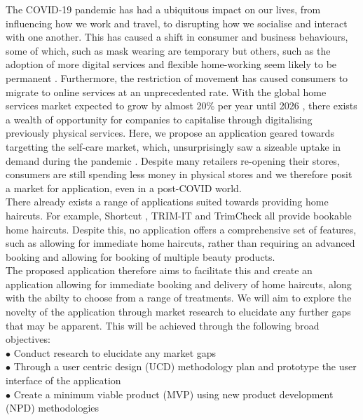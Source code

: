 \documentclass[12pt]{article}
\begin{document}
	
	
	The COVID-19 pandemic has had a ubiquitous impact on our lives, from influencing how we work and travel, to disrupting how we socialise and interact with one another. This has caused a shift in consumer and business behaviours, some of which, such as mask wearing are temporary but others, such as the adoption of more digital services and flexible home-working seem likely to be permanent \cite{mckinseyCOVID19DigitalTransformation2020}. 
	Furthermore, the restriction of movement has caused consumers to migrate to online services at an unprecedented rate. With the global home services market expected to grow by almost 20\% per year until 2026 \cite{ray28StatisticsHome2021}, there exists a wealth of opportunity for companies to capitalise through digitalising previously physical services. Here, we propose an application geared towards targetting the self-care market, which, unsurprisingly saw a sizeable uptake in demand during the pandemic \cite{cosmeticsdesign-europe.comTrendReflectionsWays}. Despite many retailers re-opening their stores, consumers are still spending less money in physical stores \cite{mckinseyEvolvingConsumerHow2020} and we therefore posit a market for application, even in a post-COVID world.
	\\
	
	There already exists a range of applications suited towards providing home haircuts. For example, Shortcut \cite{incShortcutInHomeHaircuts}, TRIM-IT \cite{TRIMITMobileBarbershopsa} and TrimCheck \cite{TrimCheckHomeHaircuts} all provide bookable home haircuts. Despite this, no application offers a comprehensive set of features, such as allowing for immediate home haircuts, rather than requiring an advanced booking and allowing for booking of multiple beauty products.
	\\
	
	The proposed application therefore aims to facilitate this and create an application allowing for immediate booking and delivery of home haircuts, along with the abilty to choose from a range of treatments. We will aim to explore the novelty of the application through market research to elucidate any further gaps that may be apparent. This will be achieved through the following broad objectives: 
	\\
	
	\noindent
	$\bullet$ Conduct research to elucidate any market gaps
	\\
	$\bullet$ Through a user centric design (UCD) methodology plan and prototype the user interface of the application
	\\
	$\bullet$ Create a minimum viable product (MVP) using new product development (NPD) methodologies
	\\
	
\end{document}
